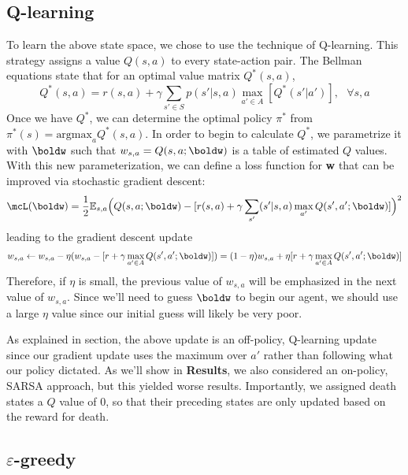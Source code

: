 \documentclass[11pt]{article}
\begin{document}
\subsection{Q-learning}
To learn the above state space, we chose to use the technique of Q-learning. This strategy assigns a value $Q(s,a)$ to every state-action pair. The Bellman equations state that for an optimal value matrix $Q^{*}(s,a)$,
$$ Q^*(s,a) = r(s,a) + \gamma \sum_{s'\in S} p(s'|s,a)\max_{a'\in{}A}[Q^{*}(s'|a')],\text{ } \forall s, a$$
Once we have $Q^*$, we can determine the optimal policy $\pi^*$ from $\pi^*(s) = \text{argmax}_{a} Q^*(s,a)$. In order to begin to calculate $Q^*$, we parametrize it with $\boldw$ such that $w_{s,a} = Q(s,a;\boldw)$ is a table of estimated $Q$ values. With this new parameterization, we can define a loss function for \textbf{w} that can be improved via stochastic gradient descent:
$$\mcL (\boldw) = \frac{1}{2}\mathbb{E}_{s,a}\Big(Q(s,a;\boldw) - [r(s,a) + \gamma\sum_{s'}(s'|s,a)\max_{a'}Q(s',a';\boldw)]\Big)^2$$
leading to the gradient descent update
$$ w_{s,a} \leftarrow w_{s,a} - \eta(w_{s,a} - [r + \gamma\max_{a'\in A}Q(s',a';\boldw)])= (1-\eta)w_{s,a} + \eta[r + \gamma\max_{a'\in A}Q(s',a';\boldw)] $$
Therefore, if $\eta$ is small, the previous value of $w_{s,a}$ will be emphasized in the next value of $w_{s,a}$. Since we'll need to guess $\boldw$ to begin our agent, we should use a large $\eta$ value since our initial guess will likely be very poor.

As explained in section, the above update is an off-policy, Q-learning update since our gradient update uses the maximum over $a'$ rather than following what our policy dictated. As we'll show in \textbf{Results}, we also considered an on-policy, SARSA approach, but this yielded worse results. Importantly, we assigned death states a $Q$ value of 0, so that their preceding states are only updated based on the reward for death.

\subsection{$\varepsilon$-greedy}
\end{document}
